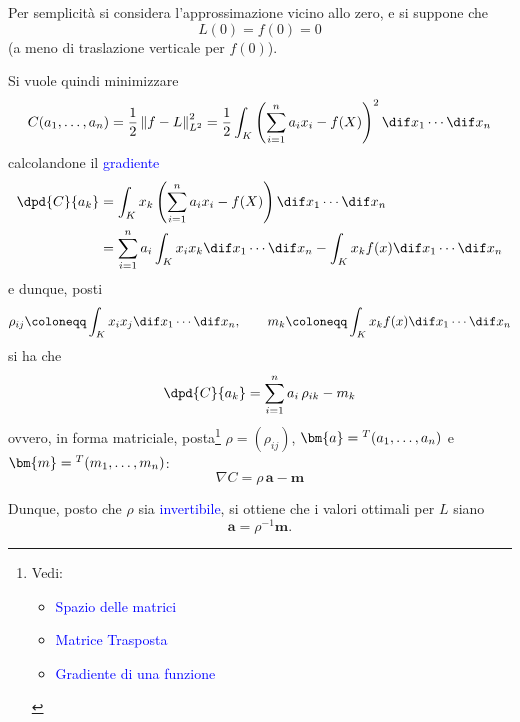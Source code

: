 \documentclass[10pt]{book}
\newcommand{\1}{\mathds{1}}
\newcommand{\norma}[1]{%
\left\lVert#1\right\rVert%
}
\theoremstyle{definition}%
\theoremstyle{plain}
\theoremstyle{remark}
\renewcommand{\href}[2]{\textcolor{blue}{#2}}
\begin{document}
Per semplicità si considera l'approssimazione vicino allo zero, e si suppone che
\begin{equation*}
L(0)=f(0)=0
\end{equation*}
(a meno di traslazione verticale per \(f(0)\)).

Si vuole quindi minimizzare
\begin{equation*}
C(a_{1},\dots,a_{n}) = \frac{1}{2}\norma{f-L}_{L^{2}}^{2} = \frac{1}{2}\int_{K} \left(\sum_{i=1}^{n} a_{i}x_{i} - f(X)\right)^{2}\dif x_{1}\cdots\dif x_{n}
\end{equation*}
calcolandone il \href{../../../../../org/roam/20250624171244-gradiente_di_una_funzione.org}{gradiente}
\begin{align*}
\dpd{C}{a_{k}} &= \int_{K} x_{k} \left(\sum_{i=1}^{n} a_{i}x_{i} - f(X)\right)\dif x_{1}\cdots\dif x_{n}\\
&= \sum_{i=1}^{n} a_{i} \int_{K} x_{i} x_{k}\dif x_{1}\cdots\dif x_{n} - \int_{K} x_{k} f(x)\dif x_{1}\cdots\dif x_{n}
\end{align*}
e dunque, posti
\begin{equation*}
\rho_{ij} \coloneqq \int_{K} x_{i}x_{j}\dif x_{1}\cdots\dif x_{n},\qquad m_{k} \coloneqq \int_{K} x_{k}f(x)\dif x_{1}\cdots\dif x_{n}
\end{equation*}
si ha che
\begin{equation*}
\dpd{C}{a_{k}} = \sum_{i=1}^{n}a_{i}\,\rho_{ik} - m_{k}
\end{equation*}
ovvero, in forma matriciale, posta\footnote{Vedi:
\begin{itemize}
\item \href{../../../../../org/roam/20250104111539-spazio_delle_matrici.org}{Spazio delle matrici}
\item \href{../../../../../org/roam/20250113144338-matrice_trasposta.org}{Matrice Trasposta}
\item \href{../../../../../org/roam/20250624171244-gradiente_di_una_funzione.org}{Gradiente di una funzione}
\end{itemize}} \(\rho=(\rho_{ij})\), \(\bm{a} = \null^{T}(a_{1},\dots,a_{n})\) e \(\bm{m} = \null^{T}(m_{1},\dots,m_{n})\):
\begin{equation*}
\nabla C = \rho\, \bm{a} - \bm{m}
\end{equation*}

Dunque, posto che \(\rho\) sia \href{../../../../../org/roam/20250104111735-matrice_invertibile.org}{invertibile}, si ottiene che i valori ottimali per \(L\) siano
\begin{equation*}
\bm{a} = \rho^{-1}\bm{m}.
\end{equation*}
\end{document}
